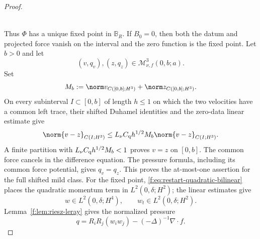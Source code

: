 \begin{proof}
\begin{samepage}
\begin{align*}
\end{align*}
\end{samepage}
Thus \(\Phi\) has a unique fixed point in \(\mathbb B_R\).  If \(B_0=0\),
then both the datum and projected force vanish on the interval and the zero
function is the fixed point.  Let \(b>0\) and let
\[
 (v,q_v),(z,q_z)\in\mathscr M_{\nu,f}^3(0,b;a).
\]
Set
\[
 M_b:=\norm v_{C([0,b];H^3)}+\norm z_{C([0,b];H^3)}.
\]
On every subinterval \(I\subset[0,b]\) of length \(h\le1\) on which the two
velocities have a common left trace, their shifted Duhamel identities and the
zero-data linear estimate give
\[
 \norm{v-z}_{C(I;H^3)}
 \le L_\nu C_{\rm q}h^{1/2}M_b
 \norm{v-z}_{C(I;H^3)}.
\]
A finite partition with
\(L_\nu C_{\rm q}h^{1/2}M_b<1\) proves \(v=z\) on \([0,b]\).
The common force cancels in the difference equation.  The pressure formula,
including its common force potential, gives \(q_v=q_z\).  This proves the at-most-one
assertion for the full shifted mild class.  For the fixed point,
\eqref{f:eq:restart-quadratic-bilinear} places the quadratic momentum term in
\(L^2(0,\delta;H^2)\); the linear estimates give
\[
 w\in L^2(0,\delta;H^4),
 \qquad
 w_t\in L^2(0,\delta;H^2).
\]
Lemma~\ref{f:lem:riesz-leray} gives the normalized pressure
\[
 q=R_iR_j(w_iw_j)-(-\Delta)^{-1}\nabla\cdot f.
\]


\end{proof}
